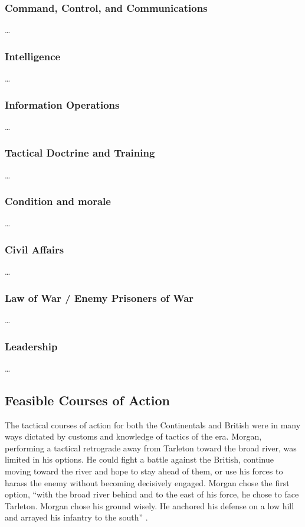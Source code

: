 \subsubsection{Command, Control, and Communications}

\ldots

\subsubsection{Intelligence}

\ldots

\subsubsection{Information Operations}

\ldots

\subsubsection{Tactical Doctrine and Training}

\ldots

\subsubsection{Condition and morale}

\ldots

\subsubsection{Civil Affairs}

\ldots

\subsubsection{Law of War / Enemy Prisoners of War}

\ldots

\subsubsection{Leadership}

\ldots

\subsection{Feasible Courses of Action}

The tactical courses of action for both the Continentals and British were in
many ways dictated by customs and knowledge of tactics of the era.  Morgan,
performing a tactical retrograde away from Tarleton toward the broad river, was
limited in his options.  He could fight a battle against the British, continue
moving toward the river and hope to stay ahead of them, or use his forces to
harass the enemy without becoming decisively engaged.  Morgan chose the first
option, ``with the broad river behind and to the east of his force, he chose to
face Tarleton.  Morgan chose his ground wisely.  He anchored his defense on a
low hill and arrayed his infantry to the south'' \cite[32]{brinkley_back_1998}.

